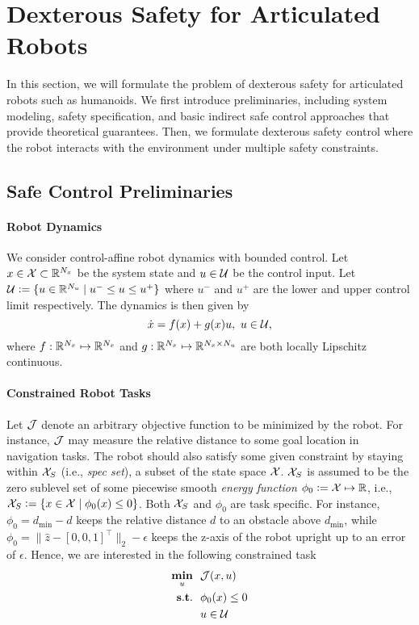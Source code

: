 \section{Dexterous Safety for Articulated Robots}\label{sec:problem}

In this section, we will formulate the problem of dexterous safety for articulated robots such as humanoids.
We first introduce preliminaries, including system modeling, safety specification, and basic indirect safe control approaches that provide theoretical guarantees.
Then, we formulate dexterous safety control where the robot interacts with the environment under multiple safety constraints.

\subsection{Safe Control Preliminaries}

\paragraph{Robot Dynamics}
We consider control-affine robot dynamics with bounded control.
Let $x\in\mathcal{X}\subset \mathbb{R}^{N_x}$ be the system state and $u\in\mathcal{U}$ be the control input.
Let $\mathcal{U}\vcentcolon=\{u\in\mathbb{R}^{N_u} \mid u^- \leq u \leq u^+ \}$ where $u^-$ and $u^+$ are the lower and upper control limit respectively.
The dynamics is then given by
\begin{equation}\label{eq:dynamics}
    \dot{x} = f(x) + g(x)u, ~ u \in \mathcal{U},
\end{equation}
where $f: \mathbb{R}^{N_x} \mapsto \mathbb{R}^{N_x}$ and $g: \mathbb{R}^{N_x} \mapsto \mathbb{R}^{N_x\times N_u}$ are both locally Lipschitz continuous.

\paragraph{Constrained Robot Tasks}
Let $\mathcal{J}$ denote an arbitrary objective function to be minimized by the robot.
For instance, $\mathcal{J}$ may measure the relative distance to some goal location in navigation tasks.
The robot should also satisfy some given constraint by staying within $\mathcal{X}_S$ (i.e., \textit{spec set}), a subset of the state space $\mathcal{X}$.
$\mathcal{X}_S$ is assumed to be the zero sublevel set of some piecewise smooth \textit{energy function} $\phi_0\vcentcolon= \mathcal{X} \mapsto \mathbb{R}$, i.e., $\mathcal{X}_S \vcentcolon= \{x\in \mathcal{X} \mid \phi_0(x) \leq 0\}$.
Both $\mathcal{X}_S$ and $\phi_0$ are task specific.
For instance, $\phi_0 = d_\mathrm{min} - d$ keeps the relative distance $d$  to an obstacle above $d_\textrm{min}$, while $\phi_0=\|\hat{z}-[0, 0, 1]^\top\|_2-\epsilon$ keeps the z-axis of the robot upright up to an error of $\epsilon$.
Hence, we are interested in the following constrained task
\begin{align}\label{prob:constrained_task}
\mathop{\underset{{u}}{\mathop{\mathbf{min}}}}~~ & \mathcal{J}(x,u)   \\ \nonumber
\mathop{\mathbf{s.t.}}~~ & \phi_0(x)\leq 0 \\ \nonumber
& u\in\mathcal{U} 
\end{align}

